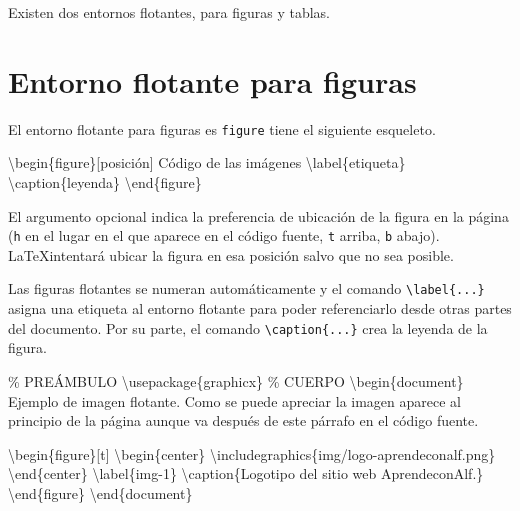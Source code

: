\documentclass[
  letterpaper,
  DIV=11,
  numbers=noendperiod]{scrreport}
\newenvironment{Shaded}{\begin{snugshade}}{\end{snugshade}}
\newcommand{\BuiltInTok}[1]{\textcolor[rgb]{0.00,0.23,0.31}{#1}}
\newcommand{\CommentTok}[1]{\textcolor[rgb]{0.37,0.37,0.37}{#1}}
\newcommand{\ExtensionTok}[1]{\textcolor[rgb]{0.00,0.23,0.31}{#1}}
\newcommand{\FunctionTok}[1]{\textcolor[rgb]{0.28,0.35,0.67}{#1}}
\newcommand{\KeywordTok}[1]{\textcolor[rgb]{0.00,0.23,0.31}{#1}}
\newcommand{\NormalTok}[1]{\textcolor[rgb]{0.00,0.23,0.31}{#1}}
\begin{document}
Existen dos entornos flotantes, para figuras y tablas.

\hypertarget{entorno-flotante-para-figuras}{%
\section{Entorno flotante para
figuras}\label{entorno-flotante-para-figuras}}

El entorno flotante para figuras es \texttt{figure} tiene el siguiente
esqueleto.

\begin{Shaded}
\begin{Highlighting}[]
\KeywordTok{\textbackslash{}begin}\NormalTok{\{}\ExtensionTok{figure}\NormalTok{\}[posición]}
\NormalTok{    Código de las imágenes}
\KeywordTok{\textbackslash{}label}\NormalTok{\{}\ExtensionTok{etiqueta}\NormalTok{\}}
\FunctionTok{\textbackslash{}caption}\NormalTok{\{leyenda\}}
\KeywordTok{\textbackslash{}end}\NormalTok{\{}\ExtensionTok{figure}\NormalTok{\}}
\end{Highlighting}
\end{Shaded}

El argumento opcional indica la preferencia de ubicación de la figura en
la página (\texttt{h} en el lugar en el que aparece en el código fuente,
\texttt{t} arriba, \texttt{b} abajo). \LaTeX intentará ubicar la
figura en esa posición salvo que no sea posible.

Las figuras flotantes se numeran automáticamente y el comando
\texttt{\textbackslash{}label\{...\}} asigna una etiqueta al entorno
flotante para poder referenciarlo desde otras partes del documento. Por
su parte, el comando \texttt{\textbackslash{}caption\{...\}} crea la
leyenda de la figura.

\begin{Shaded}
\begin{Highlighting}[]
\CommentTok{\% PREÁMBULO}
\BuiltInTok{\textbackslash{}usepackage}\NormalTok{\{}\ExtensionTok{graphicx}\NormalTok{\}}
\CommentTok{\% CUERPO}
\KeywordTok{\textbackslash{}begin}\NormalTok{\{}\ExtensionTok{document}\NormalTok{\}}
\NormalTok{Ejemplo de imagen flotante. Como se puede apreciar la imagen aparece al }
\NormalTok{principio de la página aunque va después de este párrafo en el código }
\NormalTok{fuente.}

\KeywordTok{\textbackslash{}begin}\NormalTok{\{}\ExtensionTok{figure}\NormalTok{\}[t]}
\KeywordTok{\textbackslash{}begin}\NormalTok{\{}\ExtensionTok{center}\NormalTok{\}}
\BuiltInTok{\textbackslash{}includegraphics}\NormalTok{\{}\ExtensionTok{img/logo{-}aprendeconalf.png}\NormalTok{\}}
\KeywordTok{\textbackslash{}end}\NormalTok{\{}\ExtensionTok{center}\NormalTok{\}}
\KeywordTok{\textbackslash{}label}\NormalTok{\{}\ExtensionTok{img{-}1}\NormalTok{\}}
\FunctionTok{\textbackslash{}caption}\NormalTok{\{Logotipo del sitio web AprendeconAlf.\}}
\KeywordTok{\textbackslash{}end}\NormalTok{\{}\ExtensionTok{figure}\NormalTok{\}}
\KeywordTok{\textbackslash{}end}\NormalTok{\{}\ExtensionTok{document}\NormalTok{\}}
\end{Highlighting}
\end{Shaded}
\end{document}
